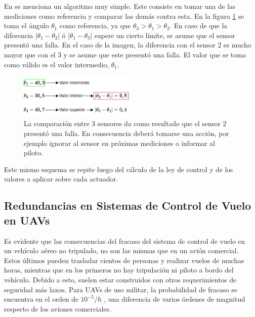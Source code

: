En \cite[p.~221]{collinson2023introduction} se menciona un algoritmo muy simple. Este consiste en tomar una de las mediciones como referencia y comparar las demás contra esta. En la figura \ref{fig:votacion_sensores} se toma el ángulo $\theta_1$ como referencia, ya que $\theta_3 > \theta_1 > \theta_2$. En caso de que la diferencia $| \theta_1 - \theta_2 |$ ó $| \theta_1 - \theta_3 |$ supere un cierto límite, se asume que el sensor presentó una falla. En el caso de la imagen, la diferencia con el sensor 2 es mucho mayor que con el 3 y se asume que este presentó una falla. El valor que se toma como válido es el valor intermedio, $\theta_1$.

\begin{figure}[H]
    \centering
    \includegraphics[width=0.5\textwidth]{img/votacion_sensores.png}
    \caption{La comparación entre 3 sensores da como resultado que el sensor 2 presentó una falla. En consecuencia deberá tomarse una acción, por ejemplo ignorar al sensor en próximas mediciones o informar al piloto.}
    \label{fig:votacion_sensores}
\end{figure}

Este mismo esquema se repite luego del cálculo de la ley de control y de los valores a aplicar sobre cada actuador.

\subsection{Redundancias en Sistemas de Control de Vuelo en UAVs}

Es evidente que las consecuencias del fracaso del sistema de control de vuelo en un vehículo aéreo no tripulado, no son las mismas que en un avión comercial. Estos últimos pueden trasladar cientos de personas y realizar vuelos de muchas horas, mientras que en los primeros no hay tripulación ni piloto a bordo del vehículo. Debido a esto, suelen estar construidos con otros requerimientos de seguridad más laxos. Para UAVs de uso militar, la probabilidad de fracaso se encuentra en el orden de $10^{-5} / h$ \cite{zhang2020architecture}\cite[p.~491]{collinson2023introduction}, una diferencia de varios órdenes de magnitud respecto de los aviones comerciales.\\

